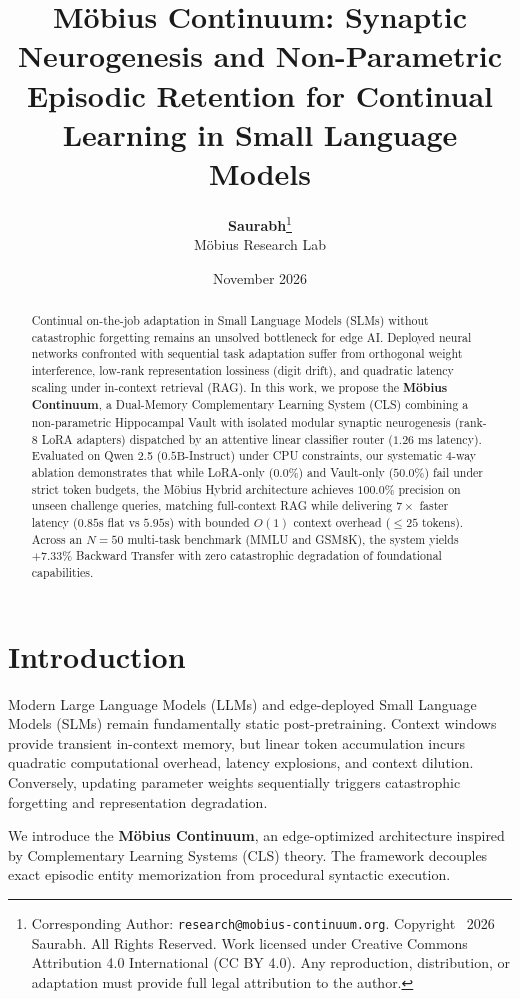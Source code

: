 \documentclass[10pt,twocolumn,letterpaper]{article}
\title{\textbf{Möbius Continuum: Synaptic Neurogenesis and Non-Parametric Episodic Retention for Continual Learning in Small Language Models}}
\author{
  \textbf{Saurabh}\thanks{Corresponding Author: \texttt{research@mobius-continuum.org}. Copyright \textcopyright\ 2026 Saurabh. All Rights Reserved. Work licensed under Creative Commons Attribution 4.0 International (CC BY 4.0). Any reproduction, distribution, or adaptation must provide full legal attribution to the author.} \\
  Möbius Research Lab
}
\date{November 2026}
\begin{document}
\maketitle

\begin{abstract}
Continual on-the-job adaptation in Small Language Models (SLMs) without catastrophic forgetting remains an unsolved bottleneck for edge AI. Deployed neural networks confronted with sequential task adaptation suffer from orthogonal weight interference, low-rank representation lossiness (digit drift), and quadratic latency scaling under in-context retrieval (RAG). In this work, we propose the \textbf{Möbius Continuum}, a Dual-Memory Complementary Learning System (CLS) combining a non-parametric Hippocampal Vault with isolated modular synaptic neurogenesis (rank-$8$ LoRA adapters) dispatched by an attentive linear classifier router ($1.26\text{ ms}$ latency). Evaluated on Qwen 2.5 ($0.5\text{B}$-Instruct) under CPU constraints, our systematic 4-way ablation demonstrates that while LoRA-only ($0.0\%$) and Vault-only ($50.0\%$) fail under strict token budgets, the Möbius Hybrid architecture achieves $100.0\%$ precision on unseen challenge queries, matching full-context RAG while delivering $7\times$ faster latency ($0.85\text{s}$ flat vs $5.95\text{s}$) with bounded $O(1)$ context overhead ($\le 25$ tokens). Across an $N=50$ multi-task benchmark (MMLU and GSM8K), the system yields $+7.33\%$ Backward Transfer with zero catastrophic degradation of foundational capabilities.
\end{abstract}

\section{Introduction}
Modern Large Language Models (LLMs) and edge-deployed Small Language Models (SLMs) remain fundamentally static post-pretraining. Context windows provide transient in-context memory, but linear token accumulation incurs quadratic computational overhead, latency explosions, and context dilution. Conversely, updating parameter weights sequentially triggers catastrophic forgetting and representation degradation.

We introduce the \textbf{Möbius Continuum}, an edge-optimized architecture inspired by Complementary Learning Systems (CLS) theory. The framework decouples exact episodic entity memorization from procedural syntactic execution.
\end{document}
